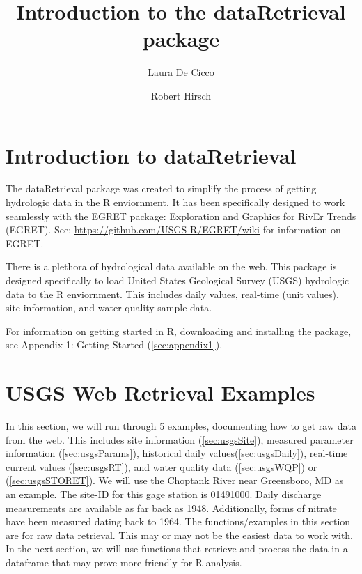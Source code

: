 \documentclass[a4paper,11pt]{article}
\begin{document}


\title{Introduction to the dataRetrieval package}
\author[1]{Laura De Cicco}
\author[1]{Robert Hirsch}



\maketitle
\tableofcontents

\section{Introduction to dataRetrieval}
The dataRetrieval package was created to simplify the process of getting hydrologic data in the R enviornment. It has been specifically designed to work seamlessly with the EGRET package: Exploration and Graphics for RivEr Trends (EGRET). See: \url{https://github.com/USGS-R/EGRET/wiki} for information on EGRET.

There is a plethora of hydrological data available on the web. This package is designed specifically to load United States Geological Survey (USGS) hydrologic data to the R enviornment. This includes daily values, real-time (unit values), site information, and water quality sample data. 

For information on getting started in R, downloading and installing the package, see Appendix 1: Getting Started (\ref{sec:appendix1}).


\section{USGS Web Retrieval Examples}
In this section, we will run through 5 examples, documenting how to get raw data from the web. This includes site information (\ref{sec:usgsSite}), measured parameter information (\ref{sec:usgsParams}), historical daily values(\ref{sec:usgsDaily}), real-time current values (\ref{sec:usgsRT}), and water quality data (\ref{sec:usgsWQP}) or (\ref{sec:usgsSTORET}). We will use the Choptank River near Greensboro, MD as an example.  The site-ID for this gage station is 01491000. Daily discharge measurements are available as far back as 1948.  Additionally, forms of nitrate have been measured dating back to 1964. The functions/examples in this section are for raw data retrieval.  This may or may not be the easiest data to work with.  In the next section, we will use functions that retrieve and process the data in a dataframe that may prove more friendly for R analysis.
\end{document}
